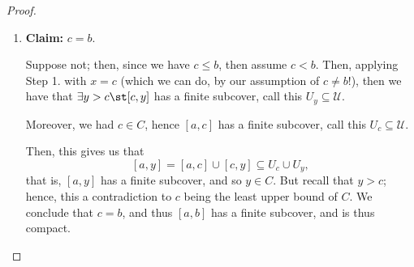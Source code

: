 \begin{proof}
\begin{enumerate}
        \item \textbf{Claim:} $c = b$.

        Suppose not; then, since we have $c \leq b$, then assume $c < b$. Then, applying Step 1. with $x = c$ (which we can do, by our assumption of $c \neq b$!), then we have that $\exists y > c \st [c, y]$ has a finite subcover, call this $U_y \subseteq \mathcal{U}$. 
        
        Moreover, we had $c \in C$, hence $[a, c]$ has a finite subcover, call this $U_c \subseteq \mathcal{U}$.

        Then, this gives us that \[
        [a, y] = [a, c] \cup [c, y] \subseteq U_c \cup U_y,
        \]
        that is, $[a, y]$ has a finite subcover, and so $y \in C$. But recall that $y > c$; hence, this a contradiction to $c$ being the least upper bound of $C$. We conclude that $c = b$, and thus $[a, b]$ has a finite subcover, and is thus compact.
    \end{enumerate}


    
\end{proof}

